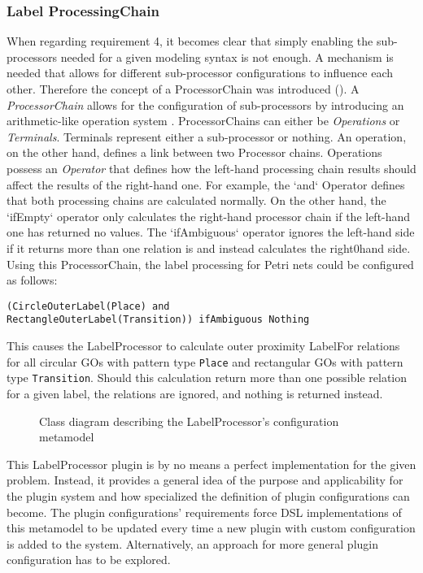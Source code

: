 \subsubsection{Label ProcessingChain}
When regarding requirement 4, it becomes clear that simply enabling the sub-processors needed for a given modeling syntax is not enough. A mechanism is needed that allows for different sub-processor configurations to influence each other. Therefore the concept of a ProcessorChain was introduced (). A \emph{ProcessorChain} allows for the configuration of sub-processors by introducing an arithmetic-like operation system . ProcessorChains can either be \emph{Operations} or \emph{Terminals}. Terminals represent either a sub-processor or nothing. An operation, on the other hand, defines a link between two Processor chains. Operations possess an \emph{Operator} that defines how the left-hand processing chain results should affect the results of the right-hand one. For example, the `and` Operator defines that both processing chains are calculated normally. On the other hand, the `ifEmpty` operator only calculates the right-hand processor chain if the left-hand one has returned no values. The `ifAmbiguous` operator ignores the left-hand side if it returns more than one relation is and instead calculates the right0hand side. Using this ProcessorChain, the label processing for Petri nets could be configured as follows:
\begin{lstlisting}
(CircleOuterLabel(Place) and 
RectangleOuterLabel(Transition)) ifAmbiguous Nothing
\end{lstlisting}
This causes the LabelProcessor to calculate outer proximity LabelFor relations for all circular GOs with pattern type \texttt{Place} and rectangular GOs with pattern type \texttt{Transition}. Should this calculation return more than one possible relation for a given label, the relations are ignored, and nothing is returned instead.

\begin{figure}[ht]
  \centering
  
  \caption{Class diagram describing the LabelProcessor's configuration metamodel}
  \label{fig:labelprocessor-config}
\end{figure}

This LabelProcessor plugin is by no means a perfect implementation for the given problem. Instead, it provides a general idea of the purpose and applicability for the plugin system and how specialized the definition of plugin configurations can become. The plugin configurations' requirements force DSL implementations of this metamodel to be updated every time a new plugin with custom configuration is added to the system. Alternatively, an approach for more general plugin configuration has to be explored.


